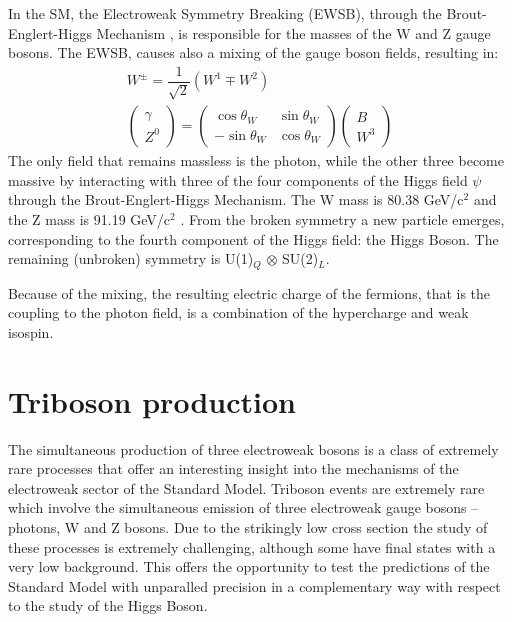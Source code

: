 In the SM, the Electroweak Symmetry Breaking (EWSB), through the Brout-Englert-Higgs Mechanism , is responsible for the masses of the W and Z gauge bosons.
The EWSB, causes also a mixing of the gauge boson fields, resulting in:
\begin{equation}
\begin{split}
  W^\pm = \dfrac{1}{\sqrt{2}} \left( W^1 \mp W^2 \right)
  \\
  \begin{pmatrix} \gamma \\ Z^0 \end{pmatrix} = \begin{pmatrix} \cos\theta_W & \sin\theta_W \\ -\sin\theta_W & \cos\theta_W \end{pmatrix} \begin{pmatrix} B \\ W^3\end{pmatrix}
\end{split}
\end{equation}
The only field that remains massless is the photon, while the other three become massive by interacting with three of the four components of the Higgs field $\psi$ through the Brout-Englert-Higgs Mechanism. The W mass is 80.38 GeV/c$^2$ and the Z mass is 91.19 GeV/c$^2$ .
From the broken symmetry a new particle emerges, corresponding to the fourth component of the Higgs field: the Higgs Boson.
The remaining (unbroken) symmetry is U(1)$_Q$ $\otimes$ SU(2)$_L$.

Because of the mixing, the resulting electric charge of the fermions, that is the coupling to the photon field, is a combination of the hypercharge and weak isospin.

\section{Triboson production}
The simultaneous production of three electroweak bosons is a class of extremely rare processes that offer an interesting insight into the mechanisms of the electroweak sector of the Standard Model.
Triboson events are extremely rare which involve the simultaneous emission of three electroweak gauge bosons -- photons, W and Z bosons.
Due to the strikingly low cross section the study of these processes is extremely challenging,
although some have final states with a very low background.
This offers the opportunity to test the predictions of the Standard Model with unparalled precision in a complementary way with respect to the study of the Higgs Boson.

